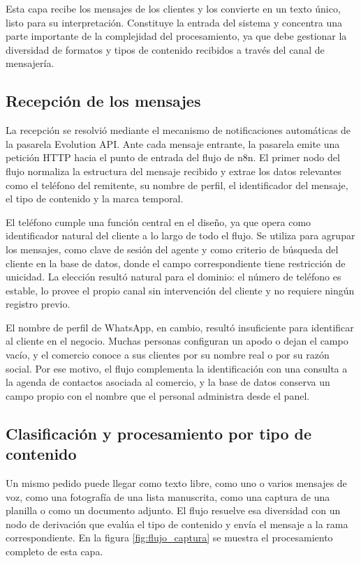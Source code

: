 Esta capa recibe los mensajes de los clientes y los convierte en un texto único, listo para su interpretación. Constituye la entrada del sistema y concentra una parte importante de la complejidad del procesamiento, ya que debe gestionar la diversidad de formatos y tipos de contenido recibidos a través del canal de mensajería.

\subsection{Recepción de los mensajes}
\label{subsec:recepcion}

La recepción se resolvió mediante el mecanismo de notificaciones automáticas de la pasarela Evolution API. Ante cada mensaje entrante, la pasarela emite una petición HTTP hacia el punto de entrada del flujo de n8n. El primer nodo del flujo normaliza la estructura del mensaje recibido y extrae los datos relevantes como el teléfono del remitente, su nombre de perfil, el identificador del mensaje, el tipo de contenido y la marca temporal.

El teléfono cumple una función central en el diseño, ya que opera como identificador natural del cliente a lo largo de todo el flujo. Se utiliza para agrupar los mensajes, como clave de sesión del agente y como criterio de búsqueda del cliente en la base de datos, donde el campo correspondiente tiene restricción de unicidad. La elección resultó natural para el dominio: el número de teléfono es estable, lo provee el propio canal sin intervención del cliente y no requiere ningún registro previo.

El nombre de perfil de WhatsApp, en cambio, resultó insuficiente para identificar al cliente en el negocio. Muchas personas configuran un apodo o dejan el campo vacío, y el comercio conoce a sus clientes por su nombre real o por su razón social. Por ese motivo, el flujo complementa la identificación con una consulta a la agenda de contactos asociada al comercio, y la base de datos conserva un campo propio con el nombre que el personal administra desde el panel.

\subsection{Clasificación y procesamiento por tipo de contenido}
\label{subsec:clasificacion}

Un mismo pedido puede llegar como texto libre, como uno o varios mensajes de voz, como una fotografía de una lista manuscrita, como una captura de una planilla o como un documento adjunto. El flujo resuelve esa diversidad con un nodo de derivación que evalúa el tipo de contenido y envía el mensaje a la rama correspondiente. En la figura \ref{fig:flujo_captura} se muestra el procesamiento completo de esta capa.

